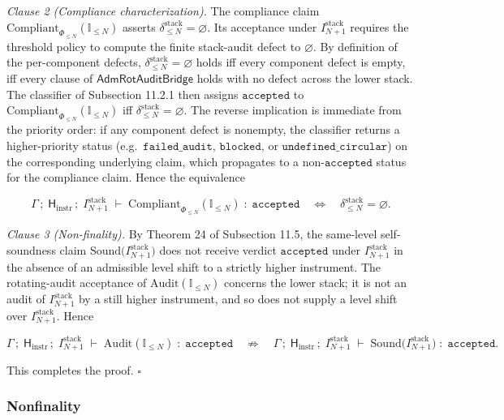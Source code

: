 \documentclass[11pt]{article}
\theoremstyle{definition}
\begin{document}
\emph{Clause 2 (Compliance characterization).} The compliance claim \(\mathrm{Compliant}_{\Phi_{\le N}}(\mathbb I_{\le N})\) asserts \(\delta_{\le N}^{\mathrm{stack}}=\varnothing\). Its acceptance under \(I_{N+1}^{\mathrm{stack}}\) requires the threshold policy to compute the finite stack-audit defect to \(\varnothing\). By definition of the per-component defects, \(\delta_{\le N}^{\mathrm{stack}}=\varnothing\) holds iff every component defect is empty, iff every clause of \(\mathsf{AdmRotAuditBridge}\) holds with no defect across the lower stack. The classifier of Subsection 11.2.1 then assigns \(\texttt{accepted}\) to \(\mathrm{Compliant}_{\Phi_{\le N}}(\mathbb I_{\le N})\) iff \(\delta_{\le N}^{\mathrm{stack}}=\varnothing\). The reverse implication is immediate from the priority order: if any component defect is nonempty, the classifier returns a higher-priority status (e.g.~\(\texttt{failed\_audit}\), \(\texttt{blocked}\), or \(\texttt{undefined\_circular}\)) on the corresponding underlying claim, which propagates to a non-\(\texttt{accepted}\) status for the compliance claim. Hence the equivalence

\[
\Gamma\,;\;\mathsf H_{\mathrm{instr}}\,;\;I_{N+1}^{\mathrm{stack}}\;\vdash\;\mathrm{Compliant}_{\Phi_{\le N}}(\mathbb I_{\le N})\;:\;\texttt{accepted}\quad\Longleftrightarrow\quad\delta_{\le N}^{\mathrm{stack}}=\varnothing.
\]

\emph{Clause 3 (Non-finality).} By Theorem 24 of Subsection 11.5, the same-level self-soundness claim \(\mathrm{Sound}\bigl(I_{N+1}^{\mathrm{stack}}\bigr)\) does not receive verdict \(\texttt{accepted}\) under \(I_{N+1}^{\mathrm{stack}}\) in the absence of an admissible level shift to a strictly higher instrument. The rotating-audit acceptance of \(\mathrm{Audit}(\mathbb I_{\le N})\) concerns the lower stack; it is not an audit of \(I_{N+1}^{\mathrm{stack}}\) by a still higher instrument, and so does not supply a level shift over \(I_{N+1}^{\mathrm{stack}}\). Hence

\[
\Gamma\,;\;\mathsf H_{\mathrm{instr}}\,;\;I_{N+1}^{\mathrm{stack}}\;\vdash\;\mathrm{Audit}(\mathbb I_{\le N})\;:\;\texttt{accepted}\quad\not\Longrightarrow\quad\Gamma\,;\;\mathsf H_{\mathrm{instr}}\,;\;I_{N+1}^{\mathrm{stack}}\;\vdash\;\mathrm{Sound}\bigl(I_{N+1}^{\mathrm{stack}}\bigr)\;:\;\texttt{accepted}.
\]

This completes the proof. \(\square\)

\subsubsection{Nonfinality}
\end{document}
